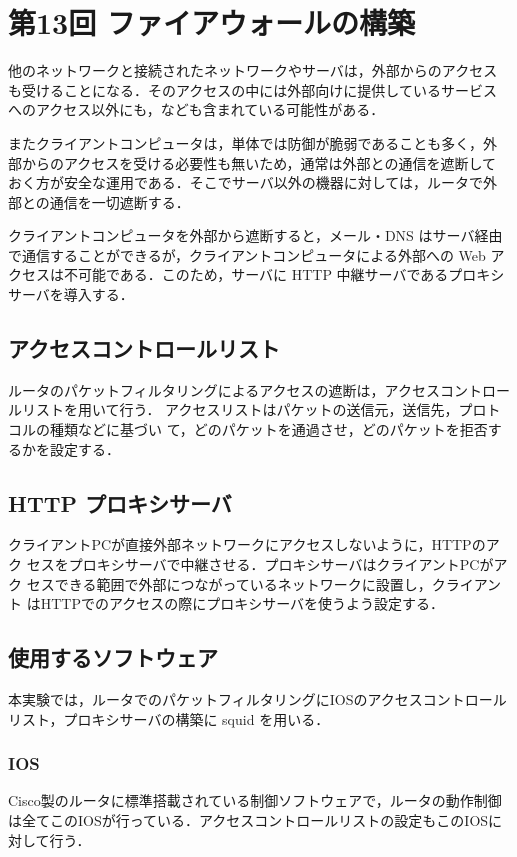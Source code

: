 \section{第13回 ファイアウォールの構築}
他のネットワークと接続されたネットワークやサーバは，外部からのアクセス
も受けることになる．そのアクセスの中には外部向けに提供しているサービス
へのアクセス以外にも，\textbf{}なども含まれている可能性がある．
\textbf{}

またクライアントコンピュータは，単体では防御が脆弱であることも多く，外
部からのアクセスを受ける必要性も無いため，通常は外部との通信を遮断して
おく方が安全な運用である．そこでサーバ以外の機器に対しては，ルータで外
部との通信を一切遮断する．

クライアントコンピュータを外部から遮断すると，メール・DNS はサーバ経由
で通信することができるが，クライアントコンピュータによる外部への Web ア
クセスは不可能である．このため，サーバに HTTP 中継サーバであるプロキシ
サーバを導入する．

\subsection*{アクセスコントロールリスト}
ルータのパケットフィルタリングによるアクセスの遮断は，アクセスコントロー
ルリストを用いて行う．
アクセスリストはパケットの送信元，送信先，プロトコルの種類などに基づい
て，どのパケットを通過させ，どのパケットを拒否するかを設定する．

\subsection*{HTTP プロキシサーバ}
クライアントPCが直接外部ネットワークにアクセスしないように，HTTPのアク
セスをプロキシサーバで中継させる．プロキシサーバはクライアントPCがアク
セスできる範囲で外部につながっているネットワークに設置し，クライアント
はHTTPでのアクセスの際にプロキシサーバを使うよう設定する．

\subsection*{使用するソフトウェア}
本実験では，ルータでのパケットフィルタリングにIOSのアクセスコントロール
リスト，プロキシサーバの構築に squid を用いる．

\subsubsection*{IOS}
Cisco製のルータに標準搭載されている制御ソフトウェアで，ルータの動作制御
は全てこのIOSが行っている．アクセスコントロールリストの設定もこのIOSに
対して行う．
